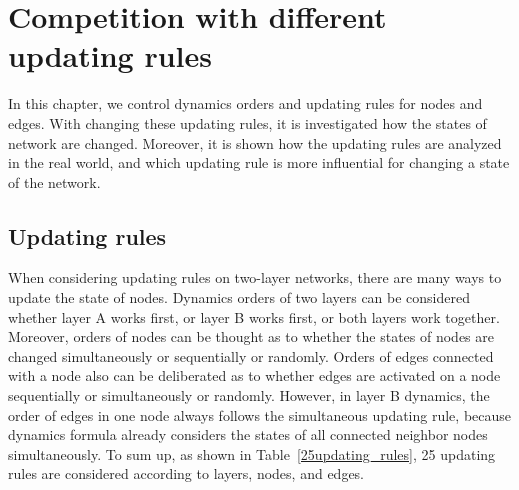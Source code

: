 
\chapter{Competition with different updating rules}
\label{chap4}
In this chapter, we control dynamics orders and updating rules for nodes and edges. With changing these updating rules, it is investigated how the states of network are changed. Moreover, it is shown how the updating rules are analyzed in the real world, and which updating rule is more influential for changing a state of the network.\\

\section{Updating rules}

When considering updating rules on two-layer networks, there are many ways to update the state of nodes. Dynamics orders of two layers can be considered whether layer A works first, or layer B works first, or both layers work together. Moreover, orders of nodes can be thought as to whether the states of nodes are changed simultaneously or sequentially or randomly. Orders of edges connected with a node also can be deliberated as to whether edges are activated on a node sequentially or simultaneously or randomly. However, in layer B dynamics, the order of edges in one node always follows the simultaneous updating rule, because dynamics formula already considers the states of all connected neighbor nodes simultaneously. To sum up, as shown in Table~\ref{25updating_rules}, 25 updating rules are considered according to layers, nodes, and edges.

